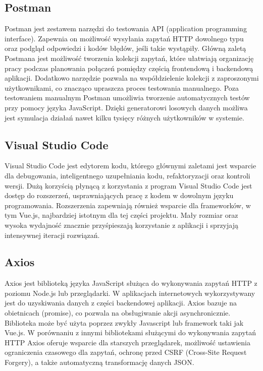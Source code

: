 \subsection{Postman}
Postman jest zestawem narzędzi do testowania API (application programming interface). Zapewnia on możliwość wysyłania zapytań HTTP dowolnego typu oraz podgląd odpowiedzi i kodów błędów, jeśli takie wystąpiły. Główną zaletą Postmana jest możliwość tworzenia kolekcji zapytań, które ułatwiają organizację pracy podczas planowania połączeń pomiędzy częścią frontendową i backendową aplikacji. Dodatkowo narzędzie pozwala na współdzielenie kolekcji z zaproszonymi użytkownikami, co znacząco upraszcza proces testowania manualnego. Poza testowaniem manualnym Postman umożliwia tworzenie automatycznych testów przy pomocy języka JavaScript. Dzięki generatorowi losowych danych możliwa jest symulacja działań nawet kilku tysięcy różnych użytkowników w systemie.
\subsection{Visual Studio Code}
Visual Studio Code jest edytorem kodu, którego głównymi zaletami jest wsparcie dla debugowania, inteligentnego uzupełniania kodu, refaktoryzacji oraz kontroli wersji. Dużą korzyścią płynącą z korzystania z program Visual Studio Code jest dostęp do rozszerzeń, usprawniających pracę z kodem w dowolnym języku programowania. Rozszerzenia zapewniają również wsparcie dla frameworków, w tym Vue.js, najbardziej istotnym dla tej części projektu. Mały rozmiar oraz wysoka wydajność znacznie przyśpieszają korzystanie z aplikacji i sprzyjają intensywnej iteracji rozwiązań.
\subsection{Axios}
Axios jest biblioteką języka JavaScript służąca do wykonywania zapytań HTTP z poziomu Node.js lub przeglądarki. W aplikacjach internetowych wykorzystywany jest do uzyskiwania danych z części backendowej aplikacji. Axios bazuje na obietnicach (promise), co pozwala na obsługiwanie akcji asynchronicznie. Biblioteka może być użyta poprzez zwykły Javascript lub framework taki jak Vue.js. W porównaniu z innymi bibliotekami służącymi do wykonywania zapytań HTTP Axios oferuje wsparcie dla starszych przeglądarek, możliwość ustawienia ograniczenia czasowego dla zapytań, ochronę przed CSRF (Cross-Site Request Forgery), a także automatyczną transformację danych JSON.
